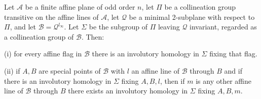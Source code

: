 Let $\mathcal{A}$ be a finite affine plane of odd order $n$, let $\Pi$ be a collineation group transitive on the affine lines of $\mathcal{A}$, let $\mathcal{Q}$ be a minimal 2-subplane with respect to $\Pi$, and let $\mathcal{B} = \mathcal{Q}^{l_{\infty}}$. Let $\Sigma$ be the subgroup of $\Pi$ leaving $\mathcal{Q}$ invariant, regarded as a collineation group of $\mathcal{B}$. Then:

(i) for every affine flag in $\mathcal{B}$ there is an involutory homology in $\Sigma$ fixing that flag.

(ii) if $A, B$ are special points of $\mathcal{B}$ with $l$ an affine line of $\mathcal{B}$ through $B$ and if there is an involutory homology in $\Sigma$ fixing $A, B, l$, then if $m$ is any other affine line of $\mathcal{B}$ through $B$ there exists an involutory homology in $\Sigma$ fixing $A, B, m$.
